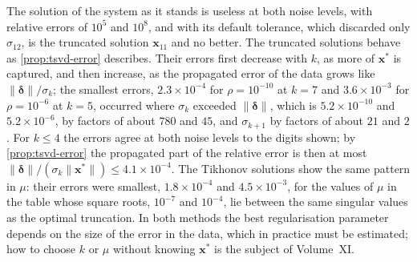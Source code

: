 \begin{table}
\end{table}

The solution of the system as it stands is useless at both noise levels, with relative errors of $10^5$ and $10^8$, and  with its default tolerance, which discarded only $\sigma_{12}$, is the truncated solution $\mathbf x_{11}$ and no better. The truncated solutions behave as \cref{prop:tsvd-error} describes. Their errors first decrease with $k$, as more of $\mathbf x^*$ is captured, and then increase, as the propagated error of the data grows like $\|\boldsymbol\delta\|/\sigma_k$; the smallest errors, $2.3\times10^{-4}$ for $\rho=10^{-10}$ at $k=7$ and $3.6\times10^{-3}$ for $\rho=10^{-6}$ at $k=5$, occurred where $\sigma_k$ exceeded $\|\boldsymbol\delta\|$, which is $5.2\times10^{-10}$ and $5.2\times10^{-6}$, by factors of about $780$ and $45$, and $\sigma_{k+1}$ by factors of about $21$ and $2$. For $k\le4$ the errors agree at both noise levels to the digits shown; by \cref{prop:tsvd-error} the propagated part of the relative error is then at most $\|\boldsymbol\delta\|/(\sigma_k\|\mathbf x^*\|)\le4.1\times10^{-4}$. The Tikhonov solutions show the same pattern in $\mu$: their errors were smallest, $1.8\times10^{-4}$ and $4.5\times10^{-3}$, for the values of $\mu$ in the table whose square roots, $10^{-7}$ and $10^{-4}$, lie between the same singular values as the optimal truncation. In both methods the best regularisation parameter depends on the size of the error in the data, which in practice must be estimated; how to choose $k$ or $\mu$ without knowing $\mathbf x^*$ is the subject of Volume~XI.

